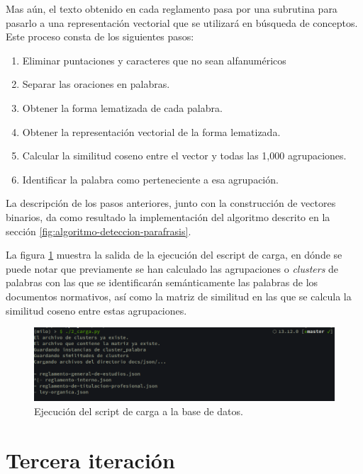 \begin{enumerate}
    Mas aún, el texto obtenido en cada reglamento pasa por una subrutina para pasarlo a una representación vectorial que se utilizará en búsqueda de conceptos. Este proceso consta de los siguientes pasos:
    
    \begin{enumerate}
        \item Eliminar puntaciones y caracteres que no sean alfanuméricos
        \item Separar las oraciones en palabras.
        \item Obtener la forma lematizada de cada palabra.
        \item Obtener la representación vectorial de la forma lematizada.
        \item Calcular la similitud coseno entre el vector y todas las 1,000 agrupaciones.
        \item Identificar la palabra como perteneciente a esa agrupación.
    \end{enumerate}
    
    La descripción de los pasos anteriores, junto con la construcción de vectores binarios, da como resultado la implementación del algoritmo descrito en la sección \ref{fig:algoritmo-deteccion-parafrasis}.
    
\end{enumerate}

La figura \ref{fig:script-carga} muestra la salida de la ejecución del escript de carga, en dónde se puede notar que previamente se han calculado las agrupaciones o \textit{clusters} de palabras con las que se identificarán semánticamente las palabras de los documentos normativos, así como la matriz de similitud en las que se calcula la similitud coseno entre estas agrupaciones.

\begin{figure}
    \centering
    \includegraphics[scale=0.5]{images/6/carga}
    \caption{Ejecución del script de carga a la base de datos.}
    \label{fig:script-carga}
\end{figure}

\section{Tercera iteración}

